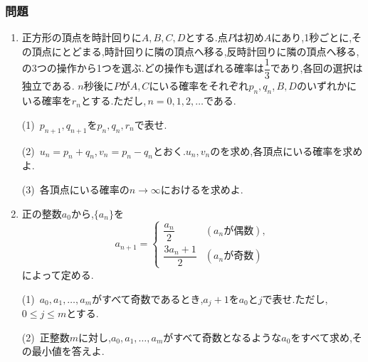       \subsubsection{問題}\label{節：発展難易度：問題}\label{節：大学過去問ベースのもの：問題}
        \begin{enumerate}[label=\textbf{問\arabic*.},leftmargin=3.8em,format=\bookitemlink{practice-entrance}{problem}{answer}]
          \item 正方形の頂点を時計回りに$A,B,C,D$とする.点$P$は初め$A$にあり,1秒ごとに,その頂点にとどまる,時計回りに隣の頂点へ移る,反時計回りに隣の頂点へ移る,の3つの操作から1つを選ぶ.どの操作も選ばれる確率は$\dfrac13$であり,各回の選択は独立である.
                $n$秒後に$P$が$A,C$にいる確率をそれぞれ$p_n,q_n$,\,$B,D$のいずれかにいる確率を$r_n$とする.ただし,\,$n=0,1,2,\ldots$である.

                \smallskip
                \noindent (1)~$p_{n+1},q_{n+1}$を$p_n,q_n,r_n$で表せ.

                \smallskip
                \noindent (2)~$u_n=p_n+q_n$,\,$v_n=p_n-q_n$とおく.$u_n,v_n$のを求め,各頂点にいる確率を求めよ.

                \smallskip
                \noindent (3)~各頂点にいる確率の$n\to\infty$におけるを求めよ.
                \par{}
          \item 正の整数$a_0$から,$\{a_n\}$を
                \[
                  a_{n+1}=\begin{cases}
                    \dfrac{a_n}{2}&(a_n\text{が偶数}),\\[3pt]
                    \dfrac{3a_n+1}{2}&(a_n\text{が奇数})
                  \end{cases}
                \]
                によって定める.

                \smallskip
                \noindent (1)~$a_0,a_1,\ldots,a_m$がすべて奇数であるとき,$a_j+1$を$a_0$と$j$で表せ.ただし,\,$0\le j\le m$とする.

                \smallskip
                \noindent (2)~正整数$m$に対し,$a_0,a_1,\ldots,a_m$がすべて奇数となるような$a_0$をすべて求め,その最小値を答えよ.


\end{enumerate}

